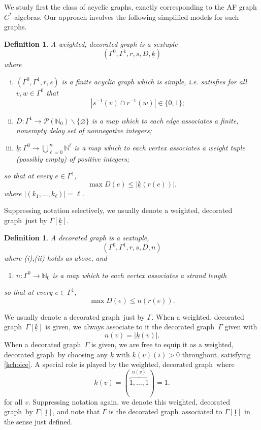 \documentclass[12pt]{amsbook}%
\theoremstyle{defin}
\newtheorem{defin}[theor]{Definition}
\theoremstyle{remark}
\numberwithin{equation}{chapter}
\numberwithin{theor}{section}
\newcommand{\kk}{\underline{k}}
\newcommand{\NN}{\mathbb{N}}
\renewcommand{\emptyset}{\varnothing}
\newcommand{\WDG}{weighted, decorated graph}
\newcommand{\DG}{decorated graph}
\begin{document}
\statusbar{\elsewhered}{\elsewhered}{\hered}{\hered}{\elsewhered}{\elsewhered}{\hered}{\hered}

We study first the class of acyclic graphs, exactly corresponding to the AF graph $C^*$-algebras. Our approach involves the following simplified models for such graphs.


\begin{defin}\label{dfn:w-decorated-graphs}
A \emph{\WDG} is a sextuple
\[
( \Gamma^0,\Gamma^1,r,s,D,\underline{k})
\]
where
\begin{enumerate}[(i)]
\item
 $(\Gamma^0,\Gamma^1,r,s)$ is a finite acyclic graph which is simple, i.e. satisfies for all $v, w \in \Gamma^0$ that
\[ |s^{-1}(v) \cap r^{-1}(w)| \in \{ 0 , 1 \} ;\]
\item $D:\Gamma^1\to {\mathcal P}(\NN_0)\backslash\{\emptyset\}$ is a map which to each edge associates a finite, nonempty \emph{delay set}  of nonnegative integers;
\item $\underline{k}:\Gamma^0\to\bigcup_{\ell=0}^\infty \NN^\ell$ is a map which to each vertex associates a \emph{weight tuple} (possibly empty) of positive integers;
\end{enumerate}
so that at every  $e \in \Gamma^1$, 
\[
\max D(e) \leq |\underline{k}(r(e))|.
\]
where $|(k_1,\dots,k_\ell)|=\ell$.
\end{defin}

Suppressing notation selectively, we usually denote a \WDG\ just by $\Gamma[\underline{k}]$.

\begin{defin}\label{dfn:decorated-graphs}
A \emph{\DG} is a sextuple, 
\[
( \Gamma^0,\Gamma^1,r,s,D,n)
\]
where (i),(ii) holds as above, and
\begin{enumerate}[(i')]\addtocounter{enumi}{2}
\item $n:\Gamma^0\to\NN_0$ is a map which to each vertex associates a \emph{strand length}
\end{enumerate}
so that at every  $e \in \Gamma^1$, 
\[
\max D(e) \leq n(r(e)). 
\]
\end{defin}

We usually denote a \DG\ just by $\Gamma$. When a \WDG\ $\Gamma[\underline{k}]$ is given, we always associate to it the \DG\ $\Gamma$ given with
\begin{equation}\label{kchoice}
n(v)=|\underline{k}(v)|.
\end{equation}
When a \DG\ $\Gamma$ is given, we are free to equip it as a \WDG\ by choosing any $\kk$ with $\kk(v)(i)>0$ throughout, satisfying \eqref{kchoice}. A special role is played by   the \WDG\ where
\[
\underline{k}(v)=(\overbrace{1,\dots,1}^{n(v)})=\underline{1}.
\]
for all $v$. Suppressing notation again,  we denote this \WDG\ by $\Gamma[\underline{1}]$, and note that $\Gamma$ is the \DG\ associated to $\Gamma[\underline{1}]$ in the sense just defined.
\end{document}

